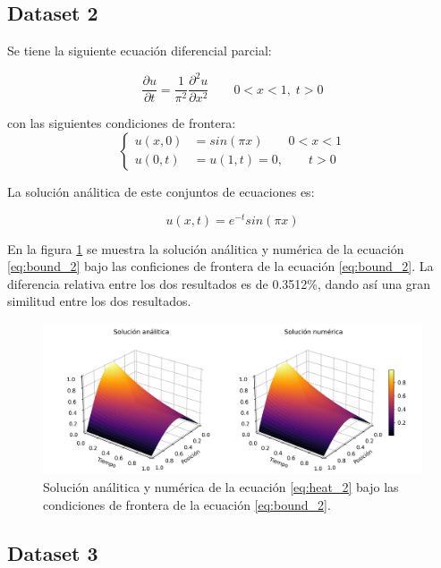 \subsection{Dataset 2}

Se tiene la siguiente ecuación diferencial parcial:

\begin{equation}
	\frac{\partial u}{\partial t} = \frac{1}{\pi^2}\frac{\partial^2 u}{\partial x^2} \qquad 0<x<1, \; t>0 \label{eq:heat_2}
\end{equation}

con las siguientes condiciones de frontera:
\begin{equation}
	\begin{cases}
		u(x,0) & = sin(\pi x) \qquad 0<x<1 \\
		u(0,t) & =u(1,t) = 0, \qquad t>0
	\end{cases} \label{eq:bound_2}
\end{equation}

La solución análitica de este conjuntos de ecuaciones es:

\begin{equation}
	u(x,t)= e^{-t}sin(\pi x) \label{eq:sol_2}
\end{equation}

En la figura \ref{fig:sol_2} se muestra la solución análitica y numérica de la ecuación \ref{eq:bound_2} bajo las conficiones de frontera de la ecuación \ref{eq:bound_2}. La diferencia relativa entre los dos resultados es de 0.3512\%, dando así una gran similitud entre los dos resultados.

\begin{figure}[H]
	\centering
	\includegraphics[width=17cm]{Graphics/surface_2.png}
	\caption{Solución análitica y numérica de la ecuación \ref{eq:heat_2} bajo las condiciones de frontera de la ecuación \ref{eq:bound_2}.}
	\label{fig:sol_2}
\end{figure}

\subsection{Dataset 3}

